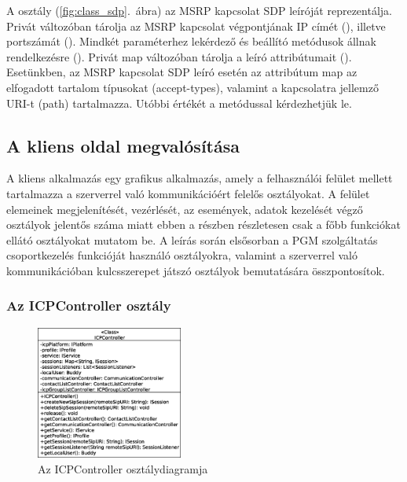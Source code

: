 A  osztály (\ref{fig:class_sdp}.~ábra) az MSRP kapcsolat SDP leíróját reprezentálja. Privát változóban tárolja az MSRP kapcsolat végpontjának IP címét (), illetve portszámát (). Mindkét paraméterhez lekérdező és beállító metódusok állnak rendelkezésre (). Privát map változóban tárolja a leíró attribútumait (). Esetünkben, az MSRP kapcsolat SDP leíró esetén az attribútum map az elfogadott tartalom típusokat (accept-types), valamint a kapcsolatra jellemző URI-t (path) tartalmazza. Utóbbi értékét a  metódussal kérdezhetjük le.

\subsection{A kliens oldal megvalósítása}

A kliens alkalmazás egy grafikus alkalmazás, amely a felhasználói felület mellett tartalmazza a szerverrel való kommunikációért felelős osztályokat. A felület elemeinek megjelenítését, vezérlését, az események, adatok kezelését végző osztályok jelentős száma miatt ebben a részben részletesen csak a főbb funkciókat ellátó osztályokat mutatom be. A leírás során elsősorban a PGM szolgáltatás csoportkezelés funkcióját használó osztályokra, valamint a szerverrel való kommunikációban kulcsszerepet játszó osztályok bemutatására összpontosítok.

\newpage
\subsubsection*{Az ICPController osztály}
\label{sec:client_icpcontroller}

\begin{figure}
  \vspace{-60pt}
  \begin{center}
    \includegraphics[width=0.43\textwidth]{img/class_diagrams/client/eps/ICPController.eps}
  \end{center}
  \vspace{-10pt}
  \captionsetup{font=scriptsize}
  \caption{Az ICPController osztálydiagramja}
   \label{fig:client_icpcontroller}
  \vspace{-18pt}
\end{figure}

